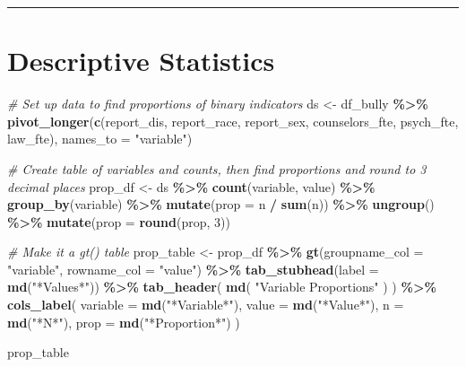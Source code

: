 \documentclass[
]{book}
\newenvironment{Shaded}{\begin{snugshade}}{\end{snugshade}}
\newcommand{\AttributeTok}[1]{\textcolor[rgb]{0.13,0.29,0.53}{#1}}
\newcommand{\CommentTok}[1]{\textcolor[rgb]{0.56,0.35,0.01}{\textit{#1}}}
\newcommand{\DecValTok}[1]{\textcolor[rgb]{0.00,0.00,0.81}{#1}}
\newcommand{\FunctionTok}[1]{\textcolor[rgb]{0.13,0.29,0.53}{\textbf{#1}}}
\newcommand{\NormalTok}[1]{#1}
\newcommand{\OtherTok}[1]{\textcolor[rgb]{0.56,0.35,0.01}{#1}}
\newcommand{\SpecialCharTok}[1]{\textcolor[rgb]{0.81,0.36,0.00}{\textbf{#1}}}
\newcommand{\StringTok}[1]{\textcolor[rgb]{0.31,0.60,0.02}{#1}}
\begin{document}
\begin{center}\rule{0.5\linewidth}{0.5pt}\end{center}

\section{Descriptive Statistics}\label{descriptive-statistics}

\begin{Shaded}
\begin{Highlighting}[]
\CommentTok{\# Set up data to find proportions of binary indicators}
\NormalTok{ds }\OtherTok{\textless{}{-}}\NormalTok{ df\_bully }\SpecialCharTok{\%\textgreater{}\%} 
  \FunctionTok{pivot\_longer}\NormalTok{(}\FunctionTok{c}\NormalTok{(report\_dis, report\_race, report\_sex, counselors\_fte, psych\_fte, law\_fte), }\AttributeTok{names\_to =} \StringTok{"variable"}\NormalTok{) }


\CommentTok{\# Create table of variables and counts, then find proportions and round to 3 decimal places}
\NormalTok{prop\_df }\OtherTok{\textless{}{-}}\NormalTok{ ds }\SpecialCharTok{\%\textgreater{}\%}
  \FunctionTok{count}\NormalTok{(variable, value) }\SpecialCharTok{\%\textgreater{}\%}
  \FunctionTok{group\_by}\NormalTok{(variable) }\SpecialCharTok{\%\textgreater{}\%}
  \FunctionTok{mutate}\NormalTok{(}\AttributeTok{prop =}\NormalTok{ n }\SpecialCharTok{/} \FunctionTok{sum}\NormalTok{(n)) }\SpecialCharTok{\%\textgreater{}\%}
  \FunctionTok{ungroup}\NormalTok{() }\SpecialCharTok{\%\textgreater{}\%}
  \FunctionTok{mutate}\NormalTok{(}\AttributeTok{prop =} \FunctionTok{round}\NormalTok{(prop, }\DecValTok{3}\NormalTok{))}


\CommentTok{\# Make it a gt() table}
\NormalTok{prop\_table }\OtherTok{\textless{}{-}}\NormalTok{ prop\_df }\SpecialCharTok{\%\textgreater{}\%} 
  \FunctionTok{gt}\NormalTok{(}\AttributeTok{groupname\_col =} \StringTok{"variable"}\NormalTok{, }\AttributeTok{rowname\_col =} \StringTok{"value"}\NormalTok{) }\SpecialCharTok{\%\textgreater{}\%}
  \FunctionTok{tab\_stubhead}\NormalTok{(}\AttributeTok{label =} \FunctionTok{md}\NormalTok{(}\StringTok{"*Values*"}\NormalTok{)) }\SpecialCharTok{\%\textgreater{}\%}
  \FunctionTok{tab\_header}\NormalTok{(}
    \FunctionTok{md}\NormalTok{(}
      \StringTok{"Variable Proportions"}
\NormalTok{    )}
\NormalTok{  ) }\SpecialCharTok{\%\textgreater{}\%}
  \FunctionTok{cols\_label}\NormalTok{(}
    \AttributeTok{variable =} \FunctionTok{md}\NormalTok{(}\StringTok{"*Variable*"}\NormalTok{),}
    \AttributeTok{value =} \FunctionTok{md}\NormalTok{(}\StringTok{"*Value*"}\NormalTok{),}
    \AttributeTok{n =} \FunctionTok{md}\NormalTok{(}\StringTok{"*N*"}\NormalTok{),}
    \AttributeTok{prop =} \FunctionTok{md}\NormalTok{(}\StringTok{"*Proportion*"}\NormalTok{)}
\NormalTok{  ) }
  
\NormalTok{prop\_table}
\end{Highlighting}
\end{Shaded}
\end{document}
